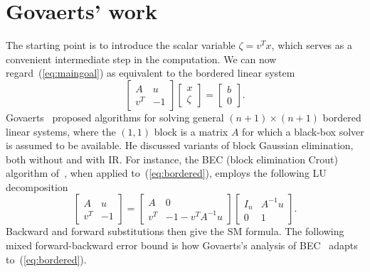 \documentclass{siamltex}
\newcommand{\eqnref}[1]{(\ref{#1})}
\begin{document}
\section{Govaerts' work}
The starting point is to introduce the scalar variable $\zeta = v^T x$, which serves as a convenient intermediate step in the computation. We can now regard~\eqnref{eq:maingoal} as equivalent to the bordered linear system 
\begin{equation}
\label{eq:bordered}
\begin{bmatrix}
A & u \\
v^T & -1
\end{bmatrix}
\begin{bmatrix}
x \\
\zeta
\end{bmatrix} =
\begin{bmatrix}
b \\
0
\end{bmatrix}.
\end{equation}
Govaerts~\cite{Govaerts91} proposed algorithms for solving general $(n+1) \times (n+1)$ bordered linear systems, where the $(1,1)$ block is a matrix $A$ for which a black-box solver is assumed to be available. He discussed variants of block Gaussian elimination, both without and with IR. For instance, the BEC (block elimination Crout) algorithm of~\cite{Govaerts91}, when applied to~\eqnref{eq:bordered}, employs the following LU decomposition
\[
\begin{bmatrix}
A & u \\
v^T & -1
\end{bmatrix}
=
\begin{bmatrix}
A & 0 \\
v^T & -1-v^T A^{-1}u
\end{bmatrix}
\begin{bmatrix}
I_n & A^{-1} u \\
0 & 1
\end{bmatrix}.
\]
Backward and forward substitutions then give the SM formula. The following mixed forward-backward error bound is how Govaerts's analysis of BEC~\cite[Prop. 3.3]{Govaerts91} adapts to~\eqnref{eq:bordered}.
\end{document}
